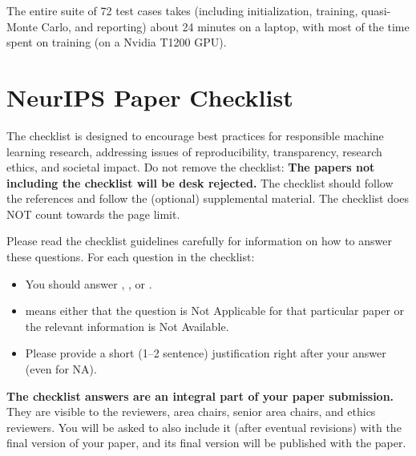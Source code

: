 \documentclass{article}
\begin{document}
The entire suite of 72 test cases takes (including initialization, training, quasi-Monte Carlo, and reporting) about 24 minutes
on a laptop, with most of the time spent on training (on a Nvidia T1200 GPU).

\clearpage



\newpage
\section*{NeurIPS Paper Checklist}

The checklist is designed to encourage best practices for responsible machine learning research, addressing issues of reproducibility, transparency, research ethics, and societal impact. Do not remove the checklist: {\bf The papers not including the checklist will be desk rejected.} The checklist should follow the references and follow the (optional) supplemental material.  The checklist does NOT count towards the page
limit. 

Please read the checklist guidelines carefully for information on how to answer these questions. For each question in the checklist:
\begin{itemize}
    \item You should answer \answerYes{}, \answerNo{}, or \answerNA{}.
    \item \answerNA{} means either that the question is Not Applicable for that particular paper or the relevant information is Not Available.
    \item Please provide a short (1–2 sentence) justification right after your answer (even for NA). 
\end{itemize}

{\bf The checklist answers are an integral part of your paper submission.} They are visible to the reviewers, area chairs, senior area chairs, and ethics reviewers. You will be asked to also include it (after eventual revisions) with the final version of your paper, and its final version will be published with the paper.
\end{document}
